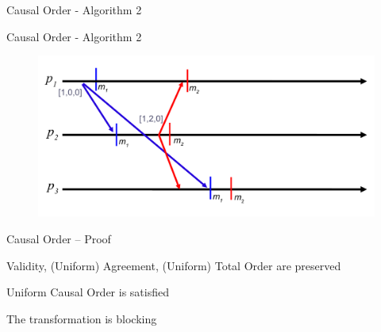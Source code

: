 \begin{frame}[shrink]{Causal Order - Algorithm 2}

\begin{Procedure}
\caption{Causal Order Transformation executed by process $p$}

\BlankLine
{}
\end{Procedure}

\end{frame}

\begin{frame}{Causal Order - Algorithm 2}
	
\begin{figure}
	\includegraphics[width=\textwidth]{rb-causal-vc}
\end{figure}

\end{frame}

\begin{frame}{Causal Order -- Proof}

\BIL
\item \alert{Validity}, \alert{(Uniform) Agreement}, \alert{(Uniform) Total Order} are preserved
\item \alert{Uniform Causal Order} is satisfied
\item The transformation is blocking
\EIL

\end{frame}


